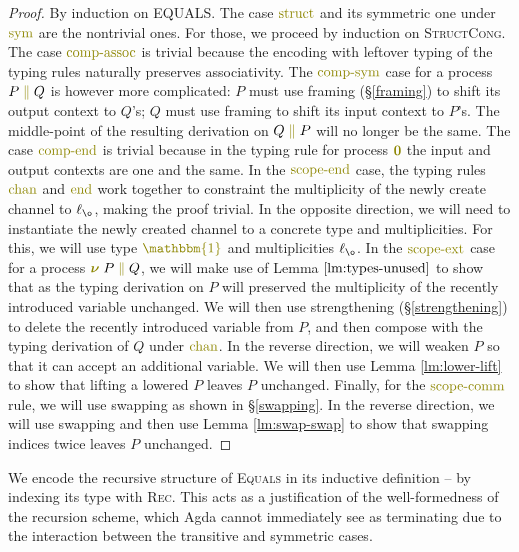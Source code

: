 \documentclass[a4paper,UKenglish,cleveref, autoref, thm-restate,authorcolumns]{lipics-v2019}
\theoremstyle{definition}
\newcommand{\constr}[1]{\textcolor{olive}{\operatorname{#1}}}
\newcommand{\PO}{\constr{\mathbf{0}}}
\newcommand{\comp}[2]{#1 \; \constr{\parallel} \; #2}
\newcommand{\new}{\constr{\boldsymbol{\nu}} \;}
\newcommand{\unit}{\constr{\mathbbm{1}}}
\begin{document}
\begin{proof}
  By induction on \textsc{EQUALS}.
  The case $\constr{struct}$ and its symmetric one under $\constr{sym}$ are the nontrivial ones.
  For those, we proceed by induction on \textsc{StructCong}.
  The case $\constr{comp-assoc}$ is trivial because the encoding with leftover typing of the typing rules naturally preserves associativity.
  The $\constr{comp-sym}$ case for a process $\comp{P}{Q}$ is however more complicated: $P$ must use framing (\S \ref{framing}) to shift its output context to $Q$'s; $Q$ must use framing to shift its input context to $P$'s.
  The middle-point of the resulting derivation on $\comp{Q}{P}$ will no longer be the same.
  The case $\constr{comp-end}$ is trivial because in the typing rule for process $\PO$ the input and output contexts are one and the same.
  In the $\constr{scope-end}$ case, the typing rules $\constr{chan}$ and $\constr{end}$ work together to constraint the multiplicity of the newly create channel to $\ell_{\o}$, making the proof trivial.
  In the opposite direction, we will need to instantiate the newly created channel to a concrete type and multiplicities.
  For this, we will use type $\unit$ and multiplicities $\ell_{\o}$.
  In the $\constr{scope-ext}$ case for a process $\new \comp{P}{Q}$, we will make use of Lemma $\ref{lm:types-unused}$ to show that as the typing derivation on $P$ will preserved the multiplicity of the recently introduced variable unchanged.
  We will then use strengthening (\S \ref{strengthening}) to delete the recently introduced variable from $P$, and then compose with the typing derivation of $Q$ under $\constr{chan}$.
  In the reverse direction, we will weaken $P$ so that it can accept an additional variable.
  We will then use Lemma \ref{lm:lower-lift} to show that lifting a lowered $P$ leaves $P$ unchanged.
  Finally, for the $\constr{scope-comm}$ rule, we will use swapping as shown in \S \ref{swapping}.
  In the reverse direction, we will use swapping and then use Lemma \ref{lm:swap-swap} to show that swapping indices twice leaves $P$ unchanged.
\end{proof}

\begin{remark}
  We encode the recursive structure of \textsc{Equals} in its inductive definition -- by indexing its type with \textsc{Rec}.
  This acts as a justification of the well-formedness of the recursion scheme, which Agda cannot immediately see as terminating due to the interaction between the transitive and symmetric cases.
\end{remark}
\end{document}
